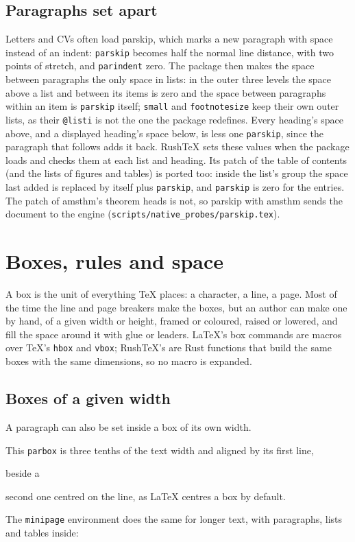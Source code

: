 \documentclass{article}
\numberwithin{equation}{section}
\theoremstyle{definition}
\theoremstyle{remark}
\begin{document}
\subsection{Paragraphs set apart}\label{sec:parskip}

Letters and CVs often load parskip, which marks a new paragraph with space instead of an
indent: \texttt{parskip} becomes half the normal line distance, with two points of
stretch, and \texttt{parindent} zero. The package then makes the space between paragraphs
the only space in lists: in the outer three levels the space above a list and between
its items is zero and the space between paragraphs within an item is \texttt{parskip}
itself; \texttt{small} and \texttt{footnotesize} keep their own outer lists, as their
\texttt{@listi} is not the one the package redefines. Every heading's space above, and a
displayed heading's space below, is less one \texttt{parskip}, since the paragraph that
follows adds it back. RushTeX sets these values when the package loads and checks them at
each list and heading. Its patch of the table of contents (and the lists of figures and
tables) is ported too: inside the list's group the space last added is replaced by itself
plus \texttt{parskip}, and \texttt{parskip} is zero for the entries. The patch of amsthm's
theorem heads is not, so parskip with amsthm sends the document to the engine
(\texttt{scripts/native\_probes/parskip.tex}).

\section{Boxes, rules and space}\label{sec:boxes}
A box is the unit of everything \TeX{} places: a character, a line, a page. Most of
the time the line and page breakers make the boxes, but an author can make one by hand,
of a given width or height, framed or coloured, raised or lowered, and fill the space
around it with glue or leaders. \LaTeX's box commands are macros over \TeX's
\texttt{hbox} and \texttt{vbox}; RushTeX's are Rust functions that build the same boxes
with the same dimensions, so no macro is expanded.

\subsection{Boxes of a given width}\label{sec:parbox}

A paragraph can also be set inside a box of its own width.
\parbox[t]{0.3\textwidth}{This \texttt{parbox} is three tenths of the text width and
aligned by its first line,} beside a \parbox{0.3\textwidth}{second one centred on the
line, as \LaTeX{} centres a box by default.} The \texttt{minipage} environment does the
same for longer text, with paragraphs, lists and tables inside:
\end{document}
